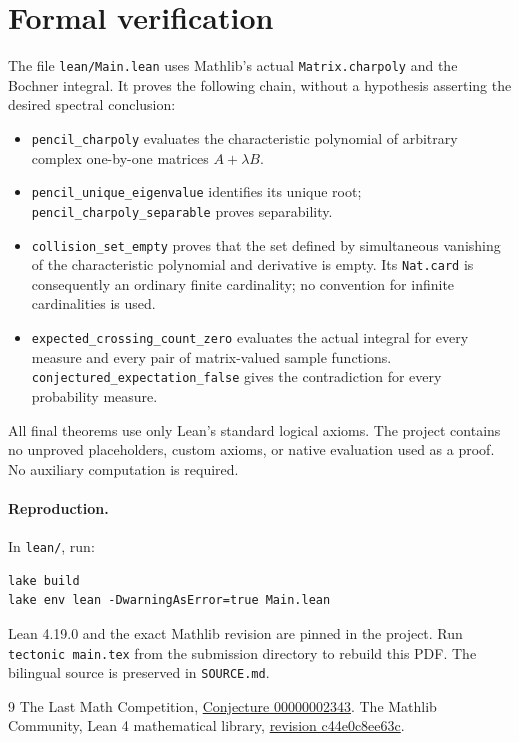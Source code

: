 \documentclass[11pt]{article}
\begin{document}
\section{Formal verification}
The file \texttt{lean/Main.lean} uses Mathlib's actual
\texttt{Matrix.charpoly} and the Bochner integral.
It proves the following chain, without a hypothesis asserting the desired
spectral conclusion:
\begin{itemize}
\item \texttt{pencil\_\allowbreak charpoly} evaluates the characteristic polynomial of
      arbitrary complex one-by-one matrices $A+\lambda B$.
\item \texttt{pencil\_\allowbreak unique\_\allowbreak eigenvalue} identifies its unique root;
      \texttt{pencil\_\allowbreak charpoly\_\allowbreak separable} proves separability.
\item \texttt{collision\_\allowbreak set\_\allowbreak empty} proves that the set defined by
      simultaneous vanishing of the characteristic polynomial and derivative
      is empty. Its \texttt{Nat.card} is consequently an ordinary finite
      cardinality; no convention for infinite cardinalities is used.
\item \texttt{expected\_\allowbreak crossing\_\allowbreak count\_\allowbreak zero} evaluates the actual integral
      for every measure and every pair of matrix-valued sample functions.
      \texttt{conjectured\_\allowbreak expectation\_\allowbreak false} gives the contradiction for
      every probability measure.
\end{itemize}
All final theorems use only Lean's standard logical axioms. The project
contains no unproved placeholders, custom axioms, or native evaluation
used as a proof. No auxiliary computation is required.

\paragraph{Reproduction.}
In \texttt{lean/}, run:
\begin{verbatim}
lake build
lake env lean -DwarningAsError=true Main.lean
\end{verbatim}
Lean 4.19.0 and the exact Mathlib revision are pinned in the project.
Run \texttt{tectonic main.tex} from the submission directory to rebuild
this PDF. The bilingual source is preserved in \texttt{SOURCE.md}.

\begin{thebibliography}{9}
 The Last Math Competition,
\href{https://github.com/The-Last-Math-Competition/The-Last-Math-Competition/blob/main/conjectures/00000002343.md}{Conjecture 00000002343}.
 The Mathlib Community, Lean 4 mathematical library,
\href{https://github.com/leanprover-community/mathlib4/commit/c44e0c8ee63ca166450922a373c7409c5d26b00b}{revision c44e0c8ee63c}.
\end{thebibliography}
\end{document}
